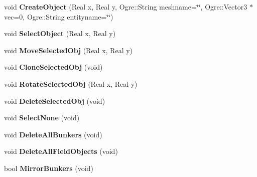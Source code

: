 \begin{DoxyCompactItemize}
\item 
\hypertarget{class_p_f_d_application_a8fda7efcac3cfc35336fb139a1c4794b}{
void {\bfseries CreateObject} (Real x, Real y, Ogre::String meshname=\char`\"{}\char`\"{}, Ogre::Vector3 $\ast$vec=0, Ogre::String entityname=\char`\"{}\char`\"{})}
\label{class_p_f_d_application_a8fda7efcac3cfc35336fb139a1c4794b}

\item 
\hypertarget{class_p_f_d_application_a4a5cd0782d895deb0921679f5e74613d}{
void {\bfseries SelectObject} (Real x, Real y)}
\label{class_p_f_d_application_a4a5cd0782d895deb0921679f5e74613d}

\item 
\hypertarget{class_p_f_d_application_afa1a9d2f5be77804528aa1b7765295de}{
void {\bfseries MoveSelectedObj} (Real x, Real y)}
\label{class_p_f_d_application_afa1a9d2f5be77804528aa1b7765295de}

\item 
\hypertarget{class_p_f_d_application_a9192b7abaa7eba816391456b5256faf3}{
void {\bfseries CloneSelectedObj} (void)}
\label{class_p_f_d_application_a9192b7abaa7eba816391456b5256faf3}

\item 
\hypertarget{class_p_f_d_application_a715532e948988c39177ee90fdd999fb2}{
void {\bfseries RotateSelectedObj} (Real x, Real y)}
\label{class_p_f_d_application_a715532e948988c39177ee90fdd999fb2}

\item 
\hypertarget{class_p_f_d_application_a06eaf54cba94ce7ab5f1aafc0ca457c6}{
void {\bfseries DeleteSelectedObj} (void)}
\label{class_p_f_d_application_a06eaf54cba94ce7ab5f1aafc0ca457c6}

\item 
\hypertarget{class_p_f_d_application_a955207eb2cac559362f19f774cd853fb}{
void {\bfseries SelectNone} (void)}
\label{class_p_f_d_application_a955207eb2cac559362f19f774cd853fb}

\item 
\hypertarget{class_p_f_d_application_afae00151e17f073c31ab60c3ff37153f}{
void {\bfseries DeleteAllBunkers} (void)}
\label{class_p_f_d_application_afae00151e17f073c31ab60c3ff37153f}

\item 
\hypertarget{class_p_f_d_application_aafede81da650e797e497aa5bd18032f4}{
void {\bfseries DeleteAllFieldObjects} (void)}
\label{class_p_f_d_application_aafede81da650e797e497aa5bd18032f4}

\item 
\hypertarget{class_p_f_d_application_a4ef631d6ce244a34bf18d04e4261bf1c}{
bool {\bfseries MirrorBunkers} (void)}
\label{class_p_f_d_application_a4ef631d6ce244a34bf18d04e4261bf1c}


\end{DoxyCompactItemize}
